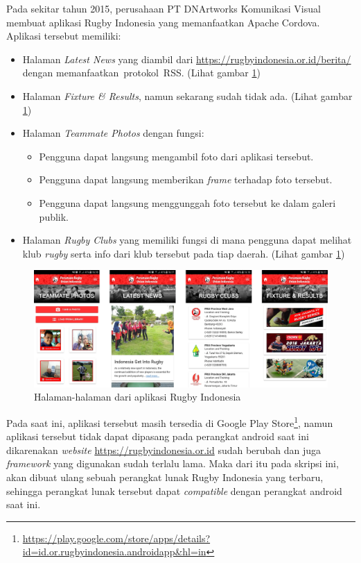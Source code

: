 Pada sekitar tahun 2015, perusahaan PT DNArtworks Komunikasi Visual membuat aplikasi Rugby Indonesia yang memanfaatkan Apache Cordova. Aplikasi tersebut memiliki: 
\begin{itemize}
    \item Halaman \textit{Latest News} yang diambil dari \url{https://rugbyindonesia.or.id/berita/} dengan memanfaatkan~protokol~RSS. {(Lihat gambar \ref{fig:rugby-halaman-label})}
    \item Halaman \textit{Fixture \& Results}, namun sekarang sudah tidak ada. {(Lihat gambar \ref{fig:rugby-halaman-label})}
    \item Halaman \textit{Teammate Photos} dengan fungsi:
    \begin{itemize}
        \item Pengguna dapat langsung mengambil foto dari aplikasi tersebut.
        \item Pengguna dapat langsung memberikan \textit{frame} terhadap foto tersebut.
        \item Pengguna dapat langsung menggunggah foto tersebut ke dalam galeri publik.
    \end{itemize}
    \item Halaman \textit{Rugby Clubs} yang memiliki fungsi di mana pengguna dapat melihat klub \textit{rugby} serta info dari klub tersebut pada tiap daerah. {(Lihat gambar \ref{fig:rugby-halaman-label})}
\end{itemize}

\begin{figure} [!h]
    \centering
    \includegraphics[scale=0.725]{Gambar/Rugby-Indonesia-App-UI.png}
    \caption[Halaman aplikasi Rugby Indonesia]{Halaman-halaman dari aplikasi Rugby Indonesia}
    \label{fig:rugby-halaman-label}
\end{figure}

Pada saat ini, aplikasi tersebut masih tersedia di Google Play Store\footnote{\url{https://play.google.com/store/apps/details?id=id.or.rugbyindonesia.androidapp\&hl=in}}, namun aplikasi tersebut tidak dapat dipasang pada perangkat android saat ini dikarenakan \textit{website} \url{https://rugbyindonesia.or.id} sudah berubah dan juga \textit{framework} yang digunakan sudah terlalu lama. Maka dari itu pada skripsi ini, akan dibuat ulang sebuah perangkat lunak Rugby Indonesia yang terbaru, sehingga perangkat lunak tersebut dapat \textit{compatible} dengan perangkat android saat ini.

